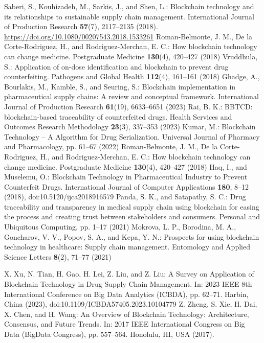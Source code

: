 \documentclass[runningheads]{llncs}
\begin{document}
%
%
%
% 
% 
%
\begin{thebibliography}{8}
Saberi, S., Kouhizadeh, M., Sarkis, J., and Shen, L.: Blockchain technology and its 
relationships to sustainable supply chain management. International Journal of Production 
Research \textbf{57}(7), 2117--2135 (2018). \url{https://doi.org/10.1080/00207543.2018.1533261}
Roman-Belmonte, J. M., De la Corte-Rodriguez, H., and Rodriguez-Merchan, E. C.: 
How blockchain technology can change medicine. Postgraduate Medicine 
\textbf{130}(4), 420--427 (2018)
Vruddhula, S.: Application of on-dose identification and blockchain to prevent drug counterfeiting. 
Pathogens and Global Health \textbf{112}(4), 161--161 (2018)
Ghadge, A., Bourlakis, M., Kamble, S., and Seuring, S.: Blockchain implementation 
in pharmaceutical supply chains: A review and conceptual framework. 
International Journal of Production Research \textbf{61}(19), 6633--6651 (2023)
Rai, B. K.: BBTCD: blockchain-based traceability of counterfeited drugs. 
Health Services and Outcomes Research Methodology \textbf{23}(3), 337--353 (2023)
Kumar, M.: Blockchain Technology – A Algorithm for Drug Serialization. 
Universal Journal of Pharmacy and Pharmacology, pp. 61--67 (2022)
Roman-Belmonte, J. M., De la Corte-Rodriguez, H., and Rodriguez-Merchan, E. C.: 
How blockchain technology can change medicine. Postgraduate Medicine 
\textbf{130}(4), 420--427 (2018)
Haq, I., and Muselemu, O.: Blockchain Technology in Pharmaceutical Industry to Prevent Counterfeit Drugs. 
International Journal of Computer Applications \textbf{180}, 8--12 (2018), 
doi:10.5120/ijca2018916579
Panda, S. K., and Satapathy, S. C.: Drug traceability and transparency in medical 
supply chain using blockchain for easing the process and creating trust between 
stakeholders and consumers. Personal and Ubiquitous Computing, pp. 1--17 (2021)
Mokrova, L. P., Borodina, M. A., Goncharov, V. V., Popov, S. A., and Kepa, Y. N.: 
Prospects for using blockchain technology in healthcare: Supply chain management. 
Entomology and Applied Science Letters \textbf{8}(2), 71--77 (2021)

X. Xu, N. Tian, H. Gao, H. Lei, Z. Liu, and Z. Liu: A Survey on Application of Blockchain Technology 
in Drug Supply Chain Management. In: 2023 IEEE 8th International Conference on Big Data Analytics 
(ICBDA), pp. 62--71. Harbin, China (2023), doi:10.1109/ICBDA57405.2023.10104779
Z. Zheng, S. Xie, H. Dai, X. Chen, and H. Wang: An Overview of Blockchain Technology: 
Architecture, Consensus, and Future Trends. In: 2017 IEEE International Congress 
on Big Data (BigData Congress), pp. 557--564. Honolulu, HI, USA (2017).

\end{thebibliography}
\end{document}
